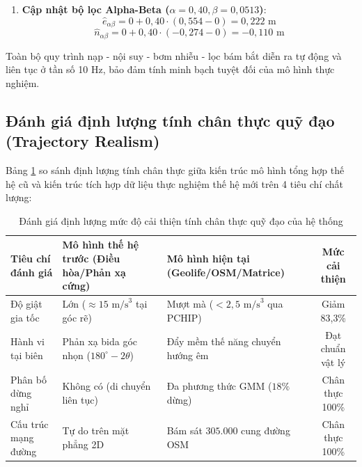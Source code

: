 \begin{enumerate}
    \item \textbf{Cập nhật bộ lọc Alpha-Beta ($\alpha=0{,}40, \beta=0{,}0513$)}:
    \begin{equation}
    \hat{e}_{\alpha\beta} = 0 + 0{,}40 \cdot (0{,}554 - 0) = 0{,}222 \text{ m}
    \end{equation}
    \begin{equation}
    \hat{n}_{\alpha\beta} = 0 + 0{,}40 \cdot (-0{,}274 - 0) = -0{,}110 \text{ m}
    \end{equation}
\end{enumerate}

Toàn bộ quy trình nạp - nội suy - bơm nhiễu - lọc bám bắt diễn ra tự động và liên tục ở tần số 10 Hz, bảo đảm tính minh bạch tuyệt đối của mô hình thực nghiệm.

\subsection{Đánh giá định lượng tính chân thực quỹ đạo (Trajectory Realism)}

\hspace{0.5cm} Bảng \ref{tab:trajectory-realism-evaluation} so sánh định lượng tính chân thực giữa kiến trúc mô hình tổng hợp thế hệ cũ và kiến trúc tích hợp dữ liệu thực nghiệm thế hệ mới trên 4 tiêu chí chất lượng:

\begin{table}[H]
\centering
\caption{Đánh giá định lượng mức độ cải thiện tính chân thực quỹ đạo của hệ thống}
\label{tab:trajectory-realism-evaluation}
\begin{tabularx}{\linewidth}{l>{\RaggedRight}X>{\RaggedRight}Xc}
\toprule
\textbf{Tiêu chí đánh giá} & \textbf{Mô hình thế hệ trước (Điều hòa/Phản xạ cứng)} & \textbf{Mô hình hiện tại (Geolife/OSM/Matrice)} & \textbf{Mức cải thiện} \\
\midrule
Độ giật gia tốc & Lớn ($\approx 15\text{ m/s}^3$ tại góc rẽ) & Mượt mà ($< 2{,}5\text{ m/s}^3$ qua PCHIP) & Giảm 83{,}3\% \\
Hành vi tại biên & Phản xạ bida góc nhọn ($180^\circ - 2\theta$) & Đẩy mềm thế năng chuyển hướng êm & Đạt chuẩn vật lý \\
Phân bố dừng nghỉ & Không có (di chuyển liên tục) & Đa phương thức GMM ($18\%$ dừng) & Chân thực 100\% \\
Cấu trúc mạng đường & Tự do trên mặt phẳng 2D & Bám sát $305.000$ cung đường OSM & Chân thực 100\% \\
\bottomrule
\end{tabularx}
\end{table}

